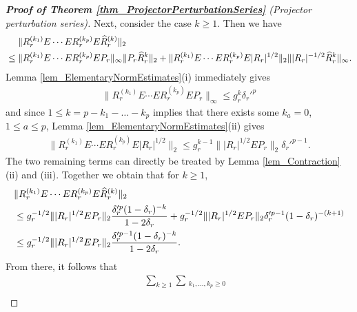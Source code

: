 \documentclass[a4paper,11pt]{article} %
\numberwithin{equation}{section}
\theoremstyle{definition}
\theoremstyle{remark}
\theoremstyle{plain}
\begin{document}
\begin{proof}[\normalfont \textbf{Proof of Theorem \ref{thm_ProjectorPerturbationSeries}} (Projector perturbation series)]
  Next, consider the case $k\geq 1$. Then we have
  \begin{align}
    \label{eq_KGreater1_1}
    & \ \ \ \
            \| R_{r}^{ ( k_{1} ) } E \cdots E R_{r}^{ ( k_{p} ) }
               E \widehat{R}_{r}^{ (k) } 
            \|_{2} 
    \\
    & \le 
            \| R_{r}^{ ( k_{1} ) } E \cdots E R_{r}^{ ( k_{p} ) } E P_{r} \|_{\infty} 
            \| P_{r} \widehat{R}_{r}^{k} \|_{2}
          + 
            \| R_{r}^{ ( k_{1} ) } E \cdots E R_{r}^{ ( k_{p} ) } E | R_{r} |^{1/2}
            \|_{2} 
            \| | R_{r} |^{-1/2} \widehat{R}_{r}^{k} \|_{\infty}.
    \notag
  \end{align}
  Lemma \ref{lem_ElementaryNormEstimates}(i) immediately gives
  \begin{align}
    \label{eq_KGreater1_2}
        \| R_{r}^{ ( k_{1} ) } E \cdots E R_{r}^{ ( k_{p} ) } E P_{r} \|_{\infty} 
    \le g_{r}^{k} \delta_{r}'^{p} 
  \end{align}
  and since \( 1 \le k = p - k_{1} - \dots - k_{p} \) implies that there exists some \( k_{a} = 0 \), \( 1 \le a \le p \), Lemma \ref{lem_ElementaryNormEstimates}(ii) gives 
  \begin{align}
    \label{eq_KGreater1_3}
        \| R_{r}^{ ( k_{1} ) } E \cdots E R_{r}^{ ( k_{p} ) } E | R_{r} |^{1/2}
        \|_{2} 
    \le 
        g_{r}^{k - 1} \| | R_{r} |^{1/2} E P_{r} \|_{2} \delta_{r}'^{p - 1}.
  \end{align}
  The two remaining terms can directly be treated by Lemma \ref{lem_Contraction}
  (ii) and (iii).
  Together we obtain that for \( k \ge 1 \), 
  \begin{align}
    &
    \| R_{r}^{ ( k_{1} ) } E \cdots E R_{r}^{ ( k_{p} ) }
       E \widehat{R}_{r}^{ (k) } 
    \|_{2} 
    \\
    & \le 
      g_{r}^{-1/2} 
      \| | R_{r} |^{1/2} E P_{r} \|_{2} 
      \frac{ \delta_{r}'^{p} ( 1 - \delta_{r} )^{-k} }{ 1 - 2 \delta_{r} } 
      + 
      g_{r}^{-1/2} 
      \| | R_{r} |^{1/2} E P_{r} \|_{2} 
      \delta_{r}'^{p - 1} 
      ( 1 - \delta_{r} )^{ - (k + 1) } 
    \notag 
    \\
    & \le 
    g_{r}^{-1/2} 
    \| | R_{r} |^{1/2} E P_{r} \|_{2} 
    \frac{ \delta_{r}'^{p-1} ( 1 - \delta_{r} )^{-k} }{ 1 - 2 \delta_{r} }. 
    \notag
  \end{align}
  From there, it follows that
  \begin{align}
    \label{eq_KGreater1_4}
    & \ \ \ \
    \sum_{ k \ge 1 } 
    \sum_{ \substack{ k_{1}, \dots, k_{p} \ge 0 \\
}}
\end{align}
\end{proof}
\end{document}
